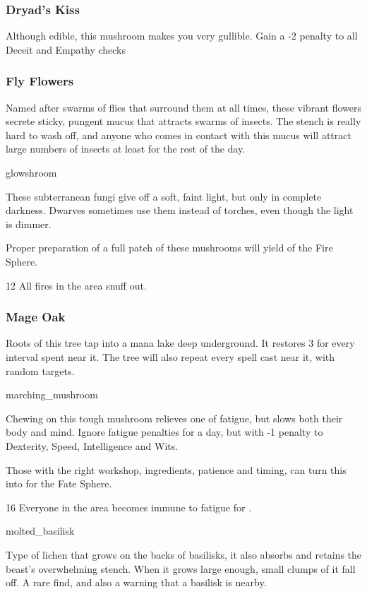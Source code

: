 \begin{multicols}{2}
\subsubsection{Dryad's Kiss}
\label{dryads_kiss}

Although edible, this mushroom makes you very gullible.
Gain a -2 penalty to all Deceit and Empathy checks

\subsubsection{Fly Flowers}
\label{fly_flowers}

Named after swarms of flies that surround them at all times, these vibrant flowers secrete sticky, pungent mucus that attracts swarms of insects.
The stench is really hard to wash off, and anyone who comes in contact with this mucus will attract large numbers of insects at least for the rest of the day.

%
  {glowshroom}%
  {
   These subterranean fungi give off a soft, faint light, but only in complete darkness.
   Dwarves sometimes use them instead of torches, even though the light is dimmer.

   Proper preparation of a full patch of these mushrooms will yield  of the Fire Sphere.
    }
  {}%
  {12}%
  {All fires in the \gls{area} snuff out.}%

\subsubsection{Mage Oak}
\label{mage_oak}

Roots of this tree tap into a mana lake deep underground.
It restores 3  for every \gls{interval} spent near it.
The tree will also repeat every spell cast near it, with random targets.

%
  {marching_mushroom}%
  {
  Chewing on this tough mushroom relieves one of fatigue, but slows both their body and mind.
    Ignore \gls{fatigue} penalties for a day, but with -1 penalty to Dexterity, Speed, Intelligence and Wits.

    Those with the right workshop, ingredients, patience and timing, can turn this into  for the Fate Sphere.
    }
{}%
{16}%
{Everyone in the area becomes immune to \gls{fatigue} for .}%

%
  {molted_basilisk}%
  {
  Type of lichen that grows on the backs of basilisks, it also absorbs and retains the beast's overwhelming stench.
  When it grows large enough, small clumps of it fall off.
  A rare find, and also a warning that a basilisk is nearby.

}
\end{multicols}
